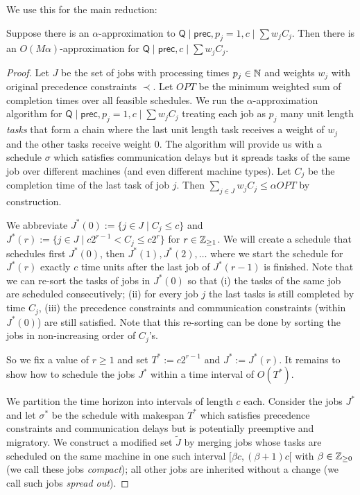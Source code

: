   
  
  
  We use this for the main reduction: 
  \begin{theorem} \label{thm:reductiontheorem}
    Suppose there is an $\alpha$-approximation to $\mathsf{Q} \mid \mathsf{prec}, p_j=1, c \mid \sum w_jC_j$.
    Then there is an $O(M\alpha)$-approximation for $\mathsf{Q} \mid \mathsf{prec}, c \mid \sum w_jC_j$.
  \end{theorem}
  \begin{proof}
    Let $J$ be the set of  jobs with processing times $p_j \in \mathbb{N}$ and weights $w_j$ with original precedence constraints $\prec$. Let $OPT$ be the minimum weighted sum of completion times over all feasible schedules. 
   We run the $\alpha$-approximation algorithm for  $\mathsf{Q} \mid \mathsf{prec}, p_j=1, c \mid \sum w_jC_j$
    treating each job as $p_j$ many unit length \emph{tasks} that form a chain where the last unit length task receives a weight of $w_j$ and the other tasks receive weight 0. The algorithm will provide us with a schedule
    $\sigma$ which satisfies communication delays but it spreads tasks of the same job over different machines (and even different machine types). Let $C_j$ be the completion time of the last task of job $j$. Then $\sum_{j \in J} w_jC_j \leq \alpha OPT$ by construction.
  
    We abbreviate $J^*(0) := \{ j \in J \mid C_j \leq c\}$ and $J^*(r) := \{ j \in J \mid c2^{r-1} < C_j \leq c2^{r}\}$ for $r \in \mathbb{Z}_{\geq 1}$. We will create a schedule that schedules first $J^*(0)$, then $J^*(1),J^*(2),\ldots$ where we start the schedule for $J^*(r)$ exactly $c$ time units after the last job of $J^*(r-1)$ is finished.
    Note that we can re-sort the tasks of jobs in $J^*(0)$ so that (i) the tasks of the same job are scheduled consecutively; (ii) for every job $j$ the last tasks is still completed by time $C_j$, (iii) the precedence constraints and communication constraints (within $J^*(0)$) are still satisfied. Note that this re-sorting can be done by sorting the jobs in non-increasing order of $C_j$'s.
  
    So we fix a value of $r \geq 1$ and set $T^* := c2^{r-1}$ and $J^* := J^*(r)$. It remains to show how to schedule the
    jobs $J^*$ within a time interval of $O(T^*)$.
  
    We partition the time horizon into intervals of length $c$ each.
    Consider the jobs $J^*$ and let $\sigma^*$ be the schedule with makespan $T^*$ which satisfies precedence constraints and communication delays but is potentially preemptive and migratory. We construct a modified set $\tilde{J}$ by merging jobs whose tasks are scheduled on the same machine in one such interval $[\beta c,(\beta+1)c[$ with $\beta \in \mathbb{Z}_{\geq 0}$ (we call these jobs \emph{compact}); all other jobs are inherited without a change (we call such jobs \emph{spread out}).
  

\end{proof}
